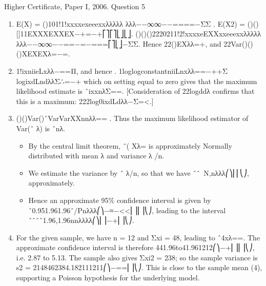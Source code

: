 \documentclass[a4paper,12pt]{article}
\begin{document}
Higher Certificate, Paper I, 2006. Question 5
\begin{enumerate}
\item E(X) = ()101!1!xxxxexeeexxλλλλλ λλλ−−∞∞−−====−ΣΣ .
E(X2) = ()()[]11EXXXEXXEX−+=−+⎡⎤⎡⎤⎣⎦⎣⎦.
()()()2220211!2!xxxxeEXXxxeeexxλλλλλ λλλ−−∞∞−−==−=−===⎡⎤⎣⎦−ΣΣ.
Hence 22()EXλλ=+, and {}22Var()()()XEXEXλ=−=.
\item  1!ixniieLxλλ−==Π, and hence . 1loglogconstantniiLnxλλ==−++Σ
logixdLndλλΣ∴=−+ which on setting equal to zero gives that the maximum likelihood estimate is ˆixxnλΣ==. [Consideration of 22logddλ confirms that this is a maximum: 222log0ixdLdλλ−Σ=<.]
\item  ()()Var()ˆVarVarXXnnλλ== .
Thus the maximum likelihood estimator of Var(ˆ
λ) is ˆnλ.
\begin{itemize}
    \item By the central limit theorem, ˆ( Xλ= is approximately Normally distributed with mean λ and variance λ /n. 
    \item We estimate the variance by ˆ
λ/n, so that we have ˆˆ~N,nλλλ⎛⎞⎜⎜⎝⎠, approximately.
\item Hence an approximate 95\% confidence interval is given by
ˆ0.951.961.96ˆ/Pnλλλ⎛⎞−≈−<<⎜⎟⎜⎟⎝⎠,
leading to the interval ˆˆˆˆ1.96,1.96nnλλλλ⎛⎞⎜⎟−+⎜⎟⎝⎠.
\end{itemize}

\item  For the given sample, we have n = 12 and Σxi = 48, leading to ˆ4xλ==. The approximate confidence interval is therefore
441.96to41.961212⎛⎞−+⎜⎟⎜⎟⎝⎠, i.e. 2.87 to 5.13.
The sample also gives Σxi2 = 238; so the sample variance is
s2 = 2148462384.182111211⎛⎞−==⎜⎟⎝⎠.
This is close to the sample mean (4), supporting a Poisson hypothesis for the underlying model.
\end{enumerate}
\end{document}
